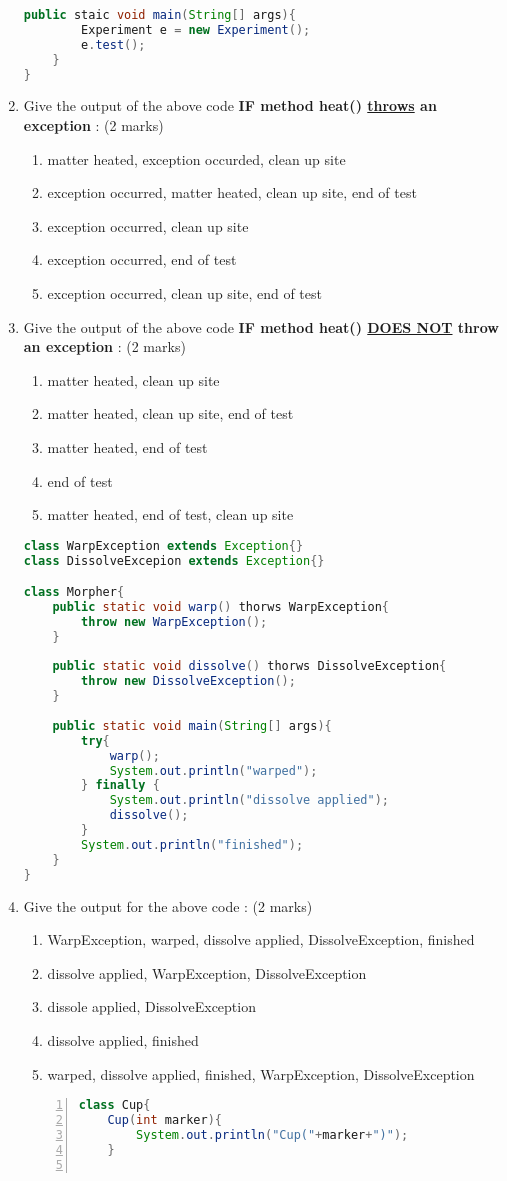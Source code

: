 \documentclass{article}
\begin{document}
\begin{enumerate}[label=\arabic* --,resume]
\begin{lstlisting}[language=Java, left=numbers]
	public staic void main(String[] args){
		Experiment e = new Experiment();
		e.test();
	}
}
	\end{lstlisting}
	\item Give the output of the above code \textbf{IF method heat() \underline{throws} an exception} : (2 marks)
	\begin{enumerate}
		\item matter heated, exception occurded, clean up site
		\item exception occurred, matter heated, clean up site, end of test
		\item exception occurred, clean up site
		\item exception occurred, end of test
		\item exception occurred, clean up site, end of test
	\end{enumerate}
	\item Give the output of the above code \textbf{IF method heat() \underline{DOES NOT} throw an exception} : (2 marks)
	\begin{enumerate}
		\item matter heated, clean up site
		\item matter heated, clean up site, end of test
		\item matter heated, end of test
		\item end of test
		\item matter heated, end of test, clean up site
	\end{enumerate}
	\begin{lstlisting}[language=Java, left=numbers, showspaces=false]
class WarpException extends Exception{}
class DissolveExcepion extends Exception{}

class Morpher{
	public static void warp() thorws WarpException{
		throw new WarpException();
	}
	
	public static void dissolve() thorws DissolveException{
		throw new DissolveException();
	}
	
	public static void main(String[] args){
		try{
			warp();
			System.out.println("warped");
		} finally {
			System.out.println("dissolve applied");
			dissolve();
		}
		System.out.println("finished");
	}
}
	\end{lstlisting}
	\item Give the output for the above code : (2 marks)
	\begin{enumerate}
		\item WarpException, warped, dissolve applied, DissolveException, finished
		\item dissolve applied, WarpException, DissolveException
		\item dissole applied, DissolveException
		\item dissolve applied, finished
		\item warped, dissolve applied, finished, WarpException, DissolveException
	\end{enumerate}
	\begin{lstlisting}[language=Java, numbers=left]
class Cup{
	Cup(int marker){
		System.out.println("Cup("+marker+")");
	}
	

\end{lstlisting}
\end{enumerate}
\end{document}
